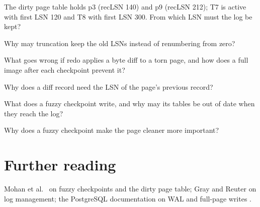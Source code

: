\begin{checkyourself}
\item The dirty page table holds p3 (recLSN 140) and p9 (recLSN 212); T7 is active with first LSN 120 and T8 with first LSN 300. From which LSN must the log be kept?
\item Why may truncation keep the old LSNs instead of renumbering from zero?
\item What goes wrong if redo applies a byte diff to a torn page, and how does a full image after each checkpoint prevent it?
\item Why does a diff record need the LSN of the page's previous record?
\item What does a fuzzy checkpoint write, and why may its tables be out of date when they reach the log?
\item Why does a fuzzy checkpoint make the page cleaner more important?
\end{checkyourself}

\section*{Further reading}
Mohan et al.\ \cite{aries} on fuzzy checkpoints and the dirty page table;
Gray and Reuter \cite{grayreuter} on log management; the PostgreSQL
documentation on WAL and full-page writes \cite{pgwal}.
